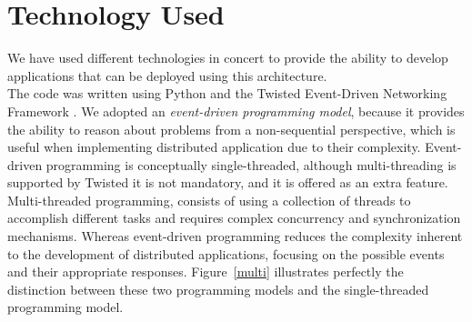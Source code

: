 \documentclass[12pt, titlepage]{uo_temp}
\begin{document}

     \section{Technology Used}
     We have used different technologies in concert to provide the ability to develop
     applications that can be deployed using this architecture.\\ 
     
     The code was written using Python and the Twisted Event-Driven Networking Framework
     \cite{twisted}. We adopted an \emph{event-driven programming model}, because it
     provides the ability to reason about problems from a non-sequential perspective,
     which is useful when implementing distributed application due to their
     complexity. Event-driven programming is conceptually single-threaded, although
     multi-threading is supported by Twisted it is not mandatory, and it is offered as an
     extra feature.
     Multi-threaded programming, consists of using a collection of threads to accomplish
     different tasks and requires complex concurrency and synchronization
     mechanisms. Whereas event-driven programming reduces the complexity inherent to the
     development of distributed applications, focusing on the possible events and their
     appropriate responses. Figure~\ref{multi} illustrates perfectly the distinction
     between these two programming models and the single-threaded programming model.
\end{document}

